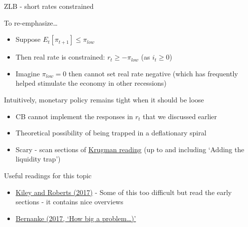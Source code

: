 \begin{frame}{ZLB - short rates constrained}

To re-emphasize\ldots
\begin{itemize}
\item	Suppose $E_{t}[\pi_{t+1}]\leq \pi_{low}$
\item	Then real rate is constrained: $r_{t}\geq -\pi_{low}$ (as $i_{t}\geq 0$)
\item	Imagine $\pi_{low}=0$ then cannot set real rate negative (which has frequently helped stimulate the economy in other recessions)
\end{itemize}

\vspace{2mm}
Intuitively, monetary policy remains tight when it should be loose
\begin{itemize}
\item	CB cannot implement the responses in $r_{t}$ that we discussed earlier
\item	Theoretical possibility of being trapped in a deflationary spiral
\item	Scary - scan sections of \href{http://web.mit.edu/krugman/www/spiral.html}{Krugman reading} (up to and including `Adding the liquidity trap')
\end{itemize}

\vspace{2mm}
Useful readings for this topic
\begin{itemize}
\item	\href{https://www.brookings.edu/wp-content/uploads/2017/03/5_kileyroberts.pdf}{Kiley and Roberts (2017)} - Some of this too difficult but read the early sections - it contains nice overviews
\item	\href{https://www.brookings.edu/blog/ben-bernanke/2017/04/12/how-big-a-problem-is-the-zero-lower-bound-on-interest-rates/}{Bernanke (2017, `How big a problem\ldots)'}
\end{itemize}

\end{frame}


	
